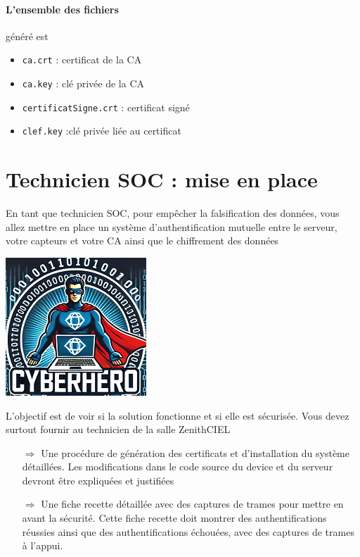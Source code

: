 \documentclass[french, 12pt]{article}%
\newcommand{\itemE}{\item[$\bullet$]}
\begin{document}
\paragraph{L'ensemble des fichiers } généré est 
\begin{itemize}
\itemE \verb?ca.crt? : certificat de la CA
\itemE \verb?ca.key? : clé privée de la CA
\itemE \verb?certificatSigne.crt? : certificat signé
\itemE \verb?clef.key? :clé privée liée au certificat
\end{itemize}


\section{Technicien SOC : mise en place}

\begin{minipage}{0.55\linewidth}
En tant que technicien SOC, pour empêcher la falsification des données, vous allez mettre en place un système d'authentification mutuelle entre le serveur, votre capteurs et votre CA ainsi que le chiffrement des données
\end{minipage}
\begin{minipage}{0.44\linewidth}
\begin{center}
\includegraphics[scale=0.7]{./ressource/cyberHro.png}
\end{center}
\end{minipage}

L'objectif est de voir si la solution fonctionne et si elle est sécurisée. Vous devez surtout fournir au technicien de la salle ZenithCIEL
\begin{itemize}
\item[$\Rightarrow$] Une procédure de génération des certificats et d'installation du système détaillées. Les modifications dans le code source du device et du serveur devront être expliquées et justifiées
\item[$\Rightarrow$] Une fiche recette détaillée avec des captures de trames pour mettre en avant la sécurité. Cette fiche recette doit montrer des authentifications réussies ainsi que des authentifications échouées, avec des captures de trames à l'appui.

\end{itemize}
\end{document}
